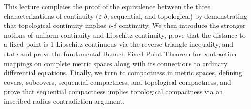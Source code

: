 


\begin{overview}
This lecture completes the proof of the equivalence between the three characterizations of continuity ($\varepsilon$-$\delta$, sequential, and topological) by demonstrating that topological continuity implies $\varepsilon$-$\delta$ continuity. We then introduce the stronger notions of uniform continuity and Lipschitz continuity, prove that the distance to a fixed point is $1$-Lipschitz continuous via the reverse triangle inequality, and state and prove the fundamental Banach Fixed Point Theorem for contraction mappings on complete metric spaces along with its connections to ordinary differential equations. Finally, we turn to compactness in metric spaces, defining covers, subcovers, sequential compactness, and topological compactness, and prove that sequential compactness implies topological compactness via an inscribed-radius contradiction argument.
\end{overview}

